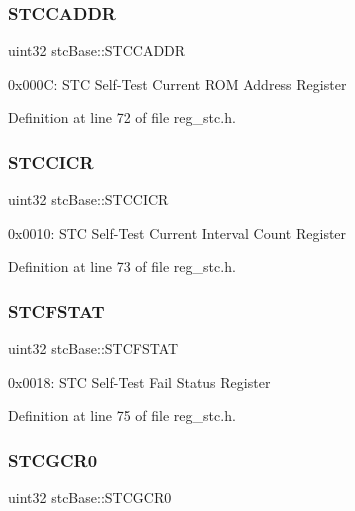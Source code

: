 \subsubsection{\texorpdfstring{S\+T\+C\+C\+A\+D\+DR}{STCCADDR}}
{\footnotesize\ttfamily uint32 stc\+Base\+::\+S\+T\+C\+C\+A\+D\+DR}

0x000C\+: S\+TC Self-\/\+Test Current R\+OM Address Register 

Definition at line 72 of file reg\+\_\+stc.\+h.

\mbox{\label{structstcBase_a7d9de0f49f992505200d799d36bc3695}} 
\subsubsection{\texorpdfstring{S\+T\+C\+C\+I\+CR}{STCCICR}}
{\footnotesize\ttfamily uint32 stc\+Base\+::\+S\+T\+C\+C\+I\+CR}

0x0010\+: S\+TC Self-\/\+Test Current Interval Count Register 

Definition at line 73 of file reg\+\_\+stc.\+h.

\mbox{\label{structstcBase_a15e35e466fbe5f4340470031fa274699}} 
\subsubsection{\texorpdfstring{S\+T\+C\+F\+S\+T\+AT}{STCFSTAT}}
{\footnotesize\ttfamily uint32 stc\+Base\+::\+S\+T\+C\+F\+S\+T\+AT}

0x0018\+: S\+TC Self-\/\+Test Fail Status Register 

Definition at line 75 of file reg\+\_\+stc.\+h.

\mbox{\label{structstcBase_ad3d1df0a36998165b922a529408d1a00}} 
\subsubsection{\texorpdfstring{S\+T\+C\+G\+C\+R0}{STCGCR0}}
{\footnotesize\ttfamily uint32 stc\+Base\+::\+S\+T\+C\+G\+C\+R0}

